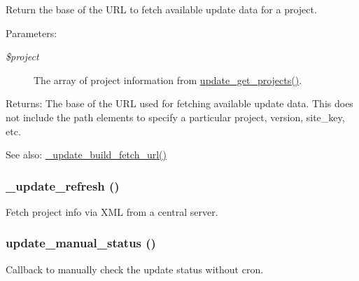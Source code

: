 Return the base of the URL to fetch available update data for a project.

\begin{Desc}
\item[Parameters:]
\begin{description}
\item[{\em \$project}]The array of project information from \hyperlink{update_8compare_8inc_7e1ea49d91f2d2b81b8101d481d10300}{update\_\-get\_\-projects()}. \end{description}
\end{Desc}
\begin{Desc}
\item[Returns:]The base of the URL used for fetching available update data. This does not include the path elements to specify a particular project, version, site\_\-key, etc.\end{Desc}
\begin{Desc}
\item[See also:]\hyperlink{update_8fetch_8inc_6d937d41a6ccf645109deefae0f6e5d3}{\_\-update\_\-build\_\-fetch\_\-url()} \end{Desc}
\hypertarget{update_8fetch_8inc_a9814236d331f2e6822435215e9acd8e}{
\subsubsection[{\_\-update\_\-refresh}]{\setlength{\rightskip}{0pt plus 5cm}\_\-update\_\-refresh ()}}
\label{update_8fetch_8inc_a9814236d331f2e6822435215e9acd8e}


Fetch project info via XML from a central server. \hypertarget{update_8fetch_8inc_cb92114e3c9f719e50f66ac62ff78e01}{
\subsubsection[{update\_\-manual\_\-status}]{\setlength{\rightskip}{0pt plus 5cm}update\_\-manual\_\-status ()}}
\label{update_8fetch_8inc_cb92114e3c9f719e50f66ac62ff78e01}


Callback to manually check the update status without cron. 